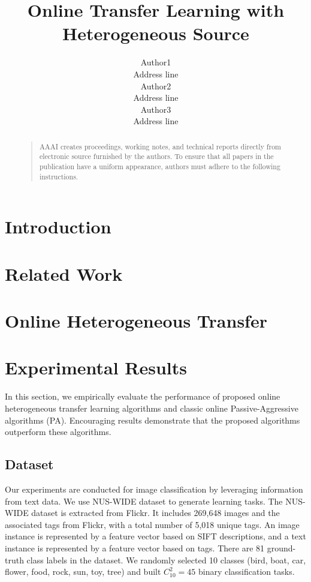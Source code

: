 \documentclass[letterpaper]{article}
\begin{document}
%
\title{Online Transfer Learning with Heterogeneous Source}
\author{Author1\\ Address line\\
\And Author2 \\ Address line\\
\And Author3 \\ Address line\\
}
\maketitle
\begin{abstract}
\begin{quote}
AAAI creates proceedings, working notes, and technical reports directly from electronic source furnished by the authors. To ensure that all papers in the publication have a uniform appearance, authors must adhere to the following instructions. 
\end{quote}
\end{abstract}


\section{Introduction}

\section{Related Work}

\section{Online Heterogeneous Transfer}

\section{Experimental Results}

In this section, we empirically evaluate the performance of proposed online heterogeneous transfer learning algorithms and classic online Passive-Aggressive algorithms (PA).
Encouraging results demonstrate that the proposed algorithms outperform these algorithms.

\subsection{Dataset}
Our experiments are conducted for image classification by leveraging information from text data.
We use NUS-WIDE dataset to generate learning tasks.
The NUS-WIDE dataset is extracted from Flickr.
It includes 269,648 images and the associated tags from Flickr, with a total number of 5,018 unique tags.
An image instance is represented by a feature vector based on SIFT descriptions, and a text instance is represented by a feature vector based on tags.
There are 81 ground-truth class labels in the dataset.
We randomly selected 10 classes (bird, boat, car, flower, food, rock, sun, toy, tree) and built $C_{10}^{2} = 45$ binary classification tasks.
\end{document}
